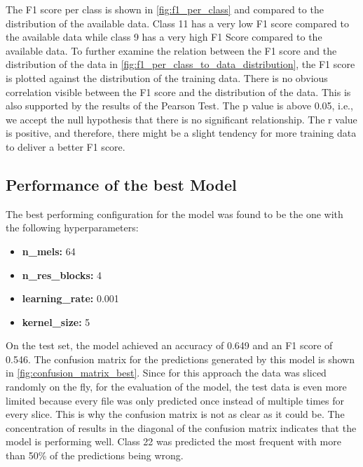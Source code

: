 

The F1 score per class is shown in \autoref{fig:f1_per_class} and compared to the distribution
of the available data. Class 11 has a very low F1 score compared to the available data while class 9 has a very high F1 Score
compared to the available data. To further examine the relation between the F1 score and the distribution of the data
in \autoref{fig:f1_per_class_to_data_distribution}, the F1 score is plotted against the distribution of the training data.
There is no obvious correlation visible between the F1 score and the distribution of the data. This is also supported by the results
of the Pearson Test. The p value is above 0.05, i.e., we accept the null hypothesis that there is no significant relationship. The r value
is positive, and therefore, there might be a slight tendency for more training data to deliver a better F1 score.






\subsection{Performance of the best Model}%

The best performing configuration for the model was found to be the one with the following hyperparameters:

\begin{itemize}
    \item \textbf{n\_mels:} 64
    \item \textbf{n\_res\_blocks:} 4
    \item \textbf{learning\_rate:} 0.001
    \item \textbf{kernel\_size:} 5
\end{itemize}

On the test set, the model achieved an accuracy of 0.649 and an F1 score of 0.546. 
The confusion matrix for the predictions generated by this model is shown in \autoref{fig:confusion_matrix_best}.
Since for this approach the data was sliced randomly on the fly, for the evaluation of the model, the test data is even more limited
because every file was only predicted once instead of multiple times for every slice. This is why the confusion matrix is not as
clear as it could be.
The concentration of results in the diagonal of the confusion matrix indicates that the model is performing well.
Class 22 was predicted the most frequent with more than 50\% of the predictions being wrong.


